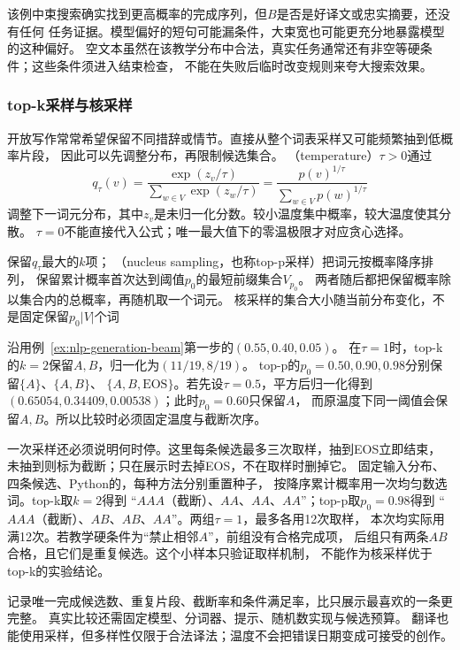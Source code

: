 该例中束搜索确实找到更高概率的完成序列，但$B$是否是好译文或忠实摘要，还没有任何
任务证据。模型偏好的短句可能漏条件，大束宽也可能更充分地暴露模型的这种偏好。
空文本虽然在该教学分布中合法，真实任务通常还有非空等硬条件；这些条件须进入结束检查，
不能在失败后临时改变规则来夸大搜索效果。

\subsubsection{top-k采样与核采样}
\label{sec:nlp-generation-sampling}

开放写作常常希望保留不同措辞或情节。直接从整个词表采样又可能频繁抽到低概率片段，
因此可以先调整分布，再限制候选集合。
（temperature）$\tau>0$通过
\begin{equation}
  q_\tau(v)=\frac{\exp(z_v/\tau)}{\sum_{w\in V}\exp(z_w/\tau)}
  =\frac{p(v)^{1/\tau}}{\sum_{w\in V}p(w)^{1/\tau}}
  \label{eq:nlp-generation-temperature}
\end{equation}
调整下一词元分布，其中$z_v$是未归一化分数。较小温度集中概率，较大温度使其分散。
$\tau=0$不能直接代入公式；唯一最大值下的零温极限才对应贪心选择。

保留$q_\tau$最大的$k$项；
（nucleus sampling，也称top-p采样）把词元按概率降序排列，
保留累计概率首次达到阈值$p_0$的最短前缀集合$V_{p_0}$。
两者随后都把保留概率除以集合内的总概率，再随机取一个词元。
核采样的集合大小随当前分布变化，不是固定保留$p_0|V|$个词

沿用例~\ref{ex:nlp-generation-beam}第一步的$(0.55,0.40,0.05)$。
在$\tau=1$时，top-k的$k=2$保留$A,B$，归一化为$(11/19,8/19)$。
top-p的$p_0=0.50,0.90,0.98$分别保留$\{A\}$、$\{A,B\}$、
$\{A,B,\mathrm{EOS}\}$。若先设$\tau=0.5$，平方后归一化得到
$(0.65054,0.34409,0.00538)$；此时$p_0=0.60$只保留$A$，
而原温度下同一阈值会保留$A,B$。所以比较时必须固定温度与截断次序。

一次采样还必须说明何时停。这里每条候选最多三次取样，抽到EOS立即结束，
未抽到则标为截断；只在展示时去掉EOS，不在取样时删掉它。
固定输入分布、四条候选、Python的，每种方法分别重置种子，
按降序累计概率用一次均匀数选词。top-k取$k=2$得到
“$AAA$（截断）、$AA$、$AA$、$AA$”；top-p取$p_0=0.98$得到
“$AAA$（截断）、$AB$、$AB$、$AA$”。两组$\tau=1$，最多各用12次取样，
本次均实际用满12次。若教学硬条件为“禁止相邻$A$”，前组没有合格完成项，
后组只有两条$AB$合格，且它们是重复候选。这个小样本只验证取样机制，
不能作为核采样优于top-k的实验结论。

记录唯一完成候选数、重复片段、截断率和条件满足率，比只展示最喜欢的一条更完整。
真实比较还需固定模型、分词器、提示、随机数实现与候选预算。
翻译也能使用采样，但多样性仅限于合法译法；温度不会把错误日期变成可接受的创作。

